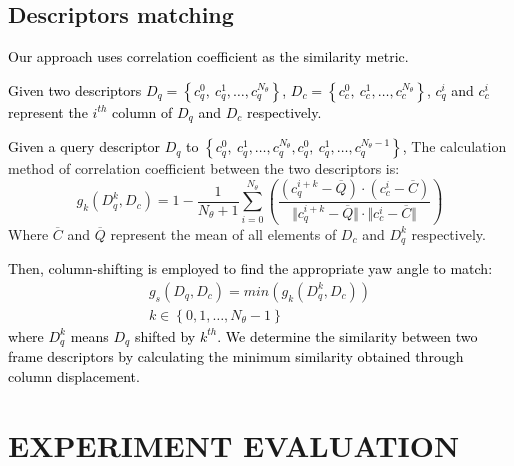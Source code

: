 \documentclass[letterpaper, 10 pt, conference]{ieeeconf}   %
\newcommand\kevin[1]{\textcolor{black}{#1}}
\begin{document}
\subsection{Descriptors matching}

\kevin{Our approach uses correlation coefficient as the similarity metric.}

\kevin{Given two descriptors $D_q=\left\{c_q^0,\ c_q^1,\ldots,c_q^{N_\theta}\right\}$, $D_c=\left\{c_c^0,\ c_c^1,\ldots,c_c^{N_\theta}\right\}$, $c_q^i$ and $c_c^i$ represent the $i^{th}$ column of $D_q$ and $D_c$ respectively. }

\kevin{Given a query descriptor $D_q$ to $\left\{c_q^0,\ c_q^1,\ldots,c_q^{N_\theta},c_q^0,\ c_q^1,\ldots,c_q^{N_ \theta-1}\right\}$,} The calculation method of correlation coefficient between the two descriptors is:
\begin{equation}
g_k\left(D_q^k,D_c\right)=1-\frac{1}{N_\theta+1}\sum_{i=0}^{N_\theta}\left(\frac{(c_q^{i+k}-\overline Q) \cdot (c_c^i - \overline C )}{{\Vert c_q^{i+k} - \overline Q \Vert}\cdot{\Vert c_c^i - \overline C \Vert}}\right)
\label{calculate correlation similirity distance}
\end{equation}
Where $\overline C$ and $\overline Q$ represent the mean of all elements of $D_c$ and $D_q^k$ respectively.

\kevin{Then, column-shifting is employed to find the appropriate yaw angle to match:}
\begin{gather}
g_s\left(D_q,D_c\right)=min\left(g_k\left(D_q^k,D_c\right)\right) \label{g_s} \\
k\in\left\{0,1,\ldots,N_\theta-1\right\}
\label{calculate maximum similirity}
\end{gather}
\kevin{where $D_q^k$ means $D_q$ shifted by $k^{th}$. We determine the similarity between two frame descriptors by calculating the minimum similarity obtained through column displacement.}

\section{EXPERIMENT EVALUATION}
\end{document}
